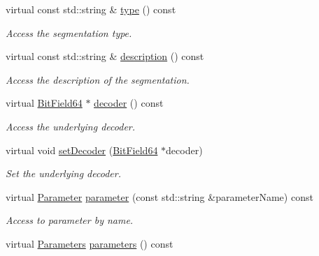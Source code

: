 \begin{DoxyCompactItemize}
virtual const std::string \& \hyperlink{class_d_d4hep_1_1_d_d_segmentation_1_1_segmentation_ad975bb46927b2da459d91295f95571df}{type} () const 
\begin{DoxyCompactList}\small\item\em Access the segmentation type. \item\end{DoxyCompactList}\item 
virtual const std::string \& \hyperlink{class_d_d4hep_1_1_d_d_segmentation_1_1_segmentation_a27f02f639e514a43d5c90f22bbaa57df}{description} () const 
\begin{DoxyCompactList}\small\item\em Access the description of the segmentation. \item\end{DoxyCompactList}\item 
virtual \hyperlink{class_d_d4hep_1_1_d_d_segmentation_1_1_bit_field64}{BitField64} $\ast$ \hyperlink{class_d_d4hep_1_1_d_d_segmentation_1_1_segmentation_a2e41ad4d215c115b00686e4ffd935851}{decoder} () const 
\begin{DoxyCompactList}\small\item\em Access the underlying decoder. \item\end{DoxyCompactList}\item 
virtual void \hyperlink{class_d_d4hep_1_1_d_d_segmentation_1_1_segmentation_ab5973bc06538d13b1991f55e40635fa0}{setDecoder} (\hyperlink{class_d_d4hep_1_1_d_d_segmentation_1_1_bit_field64}{BitField64} $\ast$decoder)
\begin{DoxyCompactList}\small\item\em Set the underlying decoder. \item\end{DoxyCompactList}\item 
virtual \hyperlink{class_d_d4hep_1_1_d_d_segmentation_1_1_segmentation_parameter}{Parameter} \hyperlink{class_d_d4hep_1_1_d_d_segmentation_1_1_segmentation_a9de5d953004c571b739827f5f201f34d}{parameter} (const std::string \&parameterName) const 
\begin{DoxyCompactList}\small\item\em Access to parameter by name. \item\end{DoxyCompactList}\item 
virtual \hyperlink{namespace_d_d4hep_1_1_d_d_segmentation_af38026430ca0e1ef64acdfc898f5dd3d}{Parameters} \hyperlink{class_d_d4hep_1_1_d_d_segmentation_1_1_segmentation_afd9f22b31cc261bfe3fd20e79be79dd5}{parameters} () const 

\end{DoxyCompactItemize}
